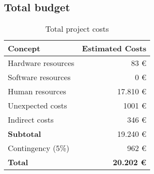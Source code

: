 \subsection{Total budget}
\begin{frame}{\insertsubsec}
  \begin{table}[H]
    \centering
    \begin{tabular}{|l|r|}
      \hline
      \textbf{Concept} & \textbf{Estimated Costs} \\ \hline\hline
  
      Hardware resources & 83 \euro \\ \hline
      Software resources & 0 \euro \\ \hline
      Human resources & 17.810 \euro \\ \hline
      Unexpected costs & 1001 \euro \\ \hline
      Indirect costs & 346 \euro \\ \hline
  
      \hline\hline
      \textbf{Subtotal} & 19.240 \euro \\
      \hline\hline
      Contingency (5\%) & 962 \euro \\
      \hline\hline
      \textbf{Total} & \textbf{20.202 \euro} \\ \hline
    \end{tabular}
  
    \caption{Total project costs \label{tab:total-costs}}
  \end{table}
\end{frame}

